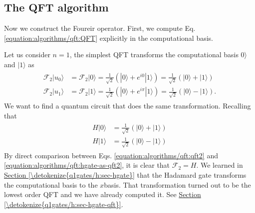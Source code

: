 \documentclass[letterpaper,10pt,english]{jupyterBook}
\begin{document}
\subsection{The QFT algorithm}
\label{\detokenize{algorithms/qft:the-qft-algorithm}}
\sphinxAtStartPar
Now we construct the Foureir operator.
First, we compute Eq. \eqref{equation:algorithms/qft:QFT} explicitly in the computational basis.

\sphinxAtStartPar
{}Let us consider \(n=1\), the simplest QFT transforms the computational basis \(0\rangle\) and \(|1\rangle\) as
\begin{equation}\label{equation:algorithms/qft:qft2}
\begin{split}
\begin{align}
\mathcal{F}_2 |u_0\rangle &= \mathcal{F}_2 |0\rangle = \frac{1}{\sqrt{2}} \left(|0\rangle +  e^{i 0} |1\rangle\right) = \frac{1}{\sqrt{2}} \left(|0\rangle + |1\rangle\right)\\
\mathcal{F}_2 |u_1\rangle &= \mathcal{F}_2 |1\rangle = \frac{1}{\sqrt{2}} \left(|0\rangle + e^{i \pi}|1\rangle\right) = \frac{1}{\sqrt{2}} \left(|0\rangle - |1\rangle\right).
\end{align}
\end{split}
\end{equation}
\sphinxAtStartPar
We want to find a quantum circuit that does the same transformation. Recalling that
\begin{equation}\label{equation:algorithms/qft:hgate-as-qft2}
\begin{split}
\begin{align}
H |0\rangle &= \frac{1}{\sqrt{2}} \left(|0\rangle + |1\rangle\right) \\
H |1\rangle &= \frac{1}{\sqrt{2}} \left(|0\rangle - |1\rangle\right)
\end{align}
\end{split}
\end{equation}
\sphinxAtStartPar
By direct comparison between Eqs. \eqref{equation:algorithms/qft:qft2} and \eqref{equation:algorithms/qft:hgate-as-qft2}, it is clear that \(\mathcal{F}_2 = H\). We learned in \hyperref[\detokenize{q1gates/h:sec-hgate}]{Section \ref{\detokenize{q1gates/h:sec-hgate}}} that the Hadamard gate transforms the computational basis to the \(x\)\sphinxhyphen{}basis. That transformation turned out to be the lowest order QFT and  we have already computed it.   See \hyperref[\detokenize{q1gates/h:sec-hgate-qft}]{Section \ref{\detokenize{q1gates/h:sec-hgate-qft}}}.
\end{document}
